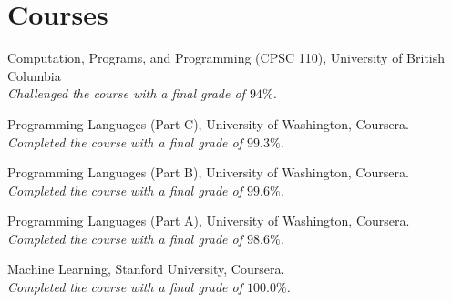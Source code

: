 \documentclass[letterpaper]{article}
\renewenvironment{itemize}{
  \begin{list}{}{
    \setlength{\leftmargin}{1.5em}
  }
}{
  \end{list}
}
\begin{document}
\section*{Courses}

\begin{itemize}
  \item Computation, Programs, and Programming (CPSC 110), University of British Columbia\\
  \emph{Challenged the course with a final grade of $94\%$.}

  \item Programming Languages (Part C), University of Washington, Coursera.\\
  \emph{Completed the course with a final grade of $99.3\%$.}

  \item Programming Languages (Part B), University of Washington, Coursera.\\
  \emph{Completed the course with a final grade of $99.6\%$.}

  \item Programming Languages (Part A), University of Washington, Coursera.\\
  \emph{Completed the course with a final grade of $98.6\%$.}

  \item Machine Learning, Stanford University, Coursera.\\
  \emph{Completed the course with a final grade of $100.0\%$.}
\end{itemize}


\bigskip

\end{document}
